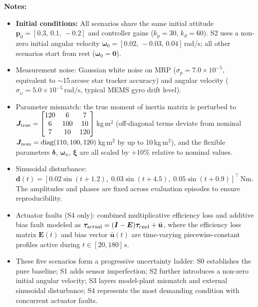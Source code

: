 \documentclass[a4paper,11pt]{article}
\begin{document}
\noindent\textbf{Notes:}
\begin{itemize}[leftmargin=*, itemsep=0pt, topsep=4pt]
\item \textbf{Initial conditions:} All scenarios share the same initial attitude $\bm{p}_0 = [0.3,\,0.1,\,-0.2]$ and controller gains ($k_p=30$, $k_d=60$). S2 uses a non-zero initial angular velocity $\bm{\omega}_0 = [0.02,\,-0.03,\,0.04]$\,rad/s; all other scenarios start from rest ($\bm{\omega}_0 = \bm{0}$).
\item Measurement noise: Gaussian white noise on MRP ($\sigma_p = 7.0\times10^{-5}$, equivalent to $\sim$15\,arcsec star tracker accuracy) and angular velocity ($\sigma_\omega = 5.0\times10^{-5}$\,rad/s, typical MEMS gyro drift level).
\item Parameter mismatch: the true moment of inertia matrix is perturbed to
$\bm{J}_{\rm true} = \begin{bmatrix} 120 & 6 & 7 \\ 6 & 100 & 10 \\ 7 & 10 & 120 \end{bmatrix}$\,kg\,m$^2$
(off-diagonal terms deviate from nominal $\bm{J}_{\rm nom} = \text{diag}(110,100,120)$\,kg\,m$^2$ by up to 10\,kg\,m$^2$), and the flexible parameters $\bm{\delta}$, $\bm{\omega}_n$, $\bm{\xi}$ are all scaled by $+10\%$ relative to nominal values.
\item Sinusoidal disturbance: $\bm{d}(t) = [0.02\sin(t+1.2),\;0.03\sin(t+4.5),\;0.05\sin(t+0.9)]^\top$\,Nm. The amplitudes and phases are fixed across evaluation episodes to ensure reproducibility.
\item Actuator faults (S4 only): combined multiplicative efficiency loss and additive bias fault modeled as $\bm{\tau}_{\rm actual} = (\bm{I} - \bm{E})\bm{\tau}_{\rm cmd} + \bar{\bm{u}}$, where the efficiency loss matrix $\bm{E}(t)$ and bias vector $\bar{\bm{u}}(t)$ are time-varying piecewise-constant profiles active during $t \in [20,180]$\,s.
\item These five scenarios form a progressive uncertainty ladder: S0 establishes the pure baseline; S1 adds sensor imperfection; S2 further introduces a non-zero initial angular velocity; S3 layers model-plant mismatch and external sinusoidal disturbance; S4 represents the most demanding condition with concurrent actuator faults.
\end{itemize}
\end{document}
